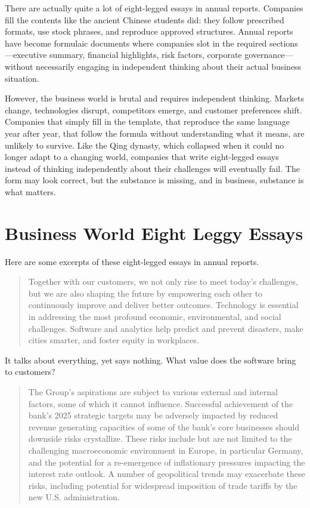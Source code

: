 There are actually quite a lot of eight-legged essays in annual reports. Companies fill the contents like the ancient Chinese students did: they follow prescribed formats, use stock phrases, and reproduce approved structures. Annual reports have become formulaic documents where companies slot in the required sections—executive summary, financial highlights, risk factors, corporate governance—without necessarily engaging in independent thinking about their actual business situation.

However, the business world is brutal and requires independent thinking. Markets change, technologies disrupt, competitors emerge, and customer preferences shift. Companies that simply fill in the template, that reproduce the same language year after year, that follow the formula without understanding what it means, are unlikely to survive. Like the Qing dynasty, which collapsed when it could no longer adapt to a changing world, companies that write eight-legged essays instead of thinking independently about their challenges will eventually fail. The form may look correct, but the substance is missing, and in business, substance is what matters.

\section{Business World Eight Leggy Essays}
Here are some excerpts of these eight-legged essays in annual reports.

\begin{quote}
    Together with our customers, we not only rise to meet today’s challenges, but we are also shaping the future by empowering each other to continuously improve and deliver better outcomes. Technology is essential in addressing the most profound economic, environmental, and social challenges. Software and analytics help predict and prevent disasters, make cities smarter, and foster equity in workplaces.
\end{quote}
    
It talks about everything, yet says nothing. What value does the software bring to customers?

\begin{quote}
    The Group’s aspirations are subject to various external and internal factors, some of which it cannot influence. Successful
achievement of the bank’s 2025 strategic targets may be adversely impacted by reduced revenue generating capacities
of some of the bank’s core businesses should downside risks crystallize. These risks include but are not limited to the
challenging macroeconomic environment in Europe, in particular Germany, and the potential for a re-emergence of
inflationary pressures impacting the interest rate outlook. A number of geopolitical trends may exacerbate these risks,
including potential for widespread imposition of trade tariffs by the new U.S. administration.
\end{quote}

